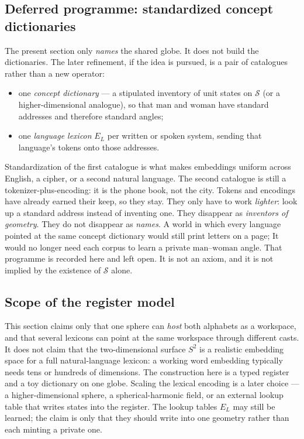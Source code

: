 \documentclass[12pt, a4paper]{article}
\begin{document}
\subsection{Deferred programme: standardized concept dictionaries}
\label{subsec:standard_dictionaries}
The present section only \emph{names} the shared globe. It does not
build the dictionaries. The later refinement, if the idea is pursued,
is a pair of catalogues rather than a new operator:
\begin{itemize}
    \item one \emph{concept dictionary} --- a stipulated inventory of
          unit states on $\mathcal{S}$ (or a higher-dimensional
          analogue), so that $\mathrm{man}$ and $\mathrm{woman}$ have
          standard addresses and therefore standard angles;
    \item one \emph{language lexicon} $E_L$ per written or spoken
          system, sending that language's tokens onto those addresses.
\end{itemize}
Standardization of the first catalogue is what makes embeddings
uniform across English, a cipher, or a second natural language.
The second catalogue is still a tokenizer-plus-encoding: it is the
phone book, not the city. Tokens and encodings have already earned
their keep, so they stay. They only have to work \emph{lighter}:
look up a standard address instead of inventing one. They disappear as
\emph{inventors of geometry}. They do not disappear as \emph{names}.
A world in which every language pointed at the same concept
dictionary would still print letters on a page; It would no longer need each 
corpus to learn a private $\mathrm{man}$--$\mathrm{woman}$ angle. 
That programme is recorded here and left open. It is not an
axiom, and it is not implied by the existence of $\mathcal{S}$ alone.

\subsection{Scope of the register model}
\label{subsec:register_scope_final}
This section claims only that one sphere can \emph{host} both alphabets
as a workspace, and that several lexicons can point at the same
workspace through different casts. It does not claim that the two-dimensional surface
$S^2$ is a realistic embedding space for a full natural-language
lexicon: a working word embedding typically needs tens or hundreds of
dimensions. The construction here is a typed register and a toy
dictionary on one globe. Scaling the lexical encoding is a later
choice --- a higher-dimensional sphere, a spherical-harmonic field, or
an external lookup table that writes states into the register. The
lookup tables $E_L$ may still be learned; the claim is only that they
should write into one geometry rather than each minting a private one.
\end{document}
